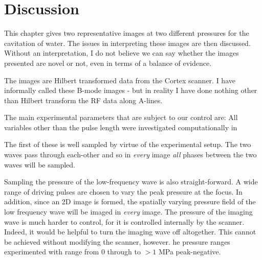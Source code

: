 



\section{Discussion} \label{sec:WE:discussion}




This chapter gives two representative images at two different pressures for the cavitation of water.
The issues in interpreting these images are then discussed.
Without an interpretation, I do not believe we can say whether the images presented are novel or not, 
even in terms of a balance of evidence.

The images are Hilbert transformed data from the Cortex scanner.
I have informally called these B-mode images - but in reality I have done nothing other than  Hilbert transform the RF data along A-lines.




 The main experimental parameters that are 
 subject to our control are:
 All variables other than the pulse length were investigated computationally in  


 The first of these is well sampled by  virtue of the experimental
 setup.
 The two waves pass through each-other and so in {\em every} image {\em
   all}
 phases between the two waves will be sampled.

 Sampling the pressure of the low-frequency wave is also
 straight-forward.
 A wide range of driving pulses are chosen to vary the peak pressure
 at the focus.
 In addition, since an 2D image is formed, 
 the spatially varying pressure field of the low frequency wave 
 will be imaged in  {\em every } image.
 The pressure of the imaging wave is much harder to control,
 for it is controlled internally by the scanner.
Indeed, it would be helpful to turn the imaging wave off altogether.
This cannot be achieved without modifying the scanner, however.
he pressure ranges experimented with range from 0 through to $>1$ MPa
peak-negative.

